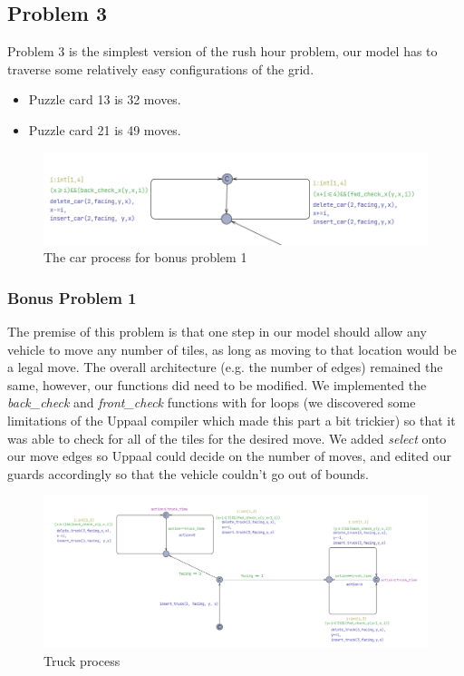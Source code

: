 \documentclass{article}
\begin{document}
\subsection{Problem 3}
Problem 3 is the simplest version of the rush hour problem, our model has to traverse some relatively easy configurations of the grid.
\begin{itemize}
    \item Puzzle card 13 is 32 moves.
    \item Puzzle card 21 is 49 moves.
\end{itemize}

\begin{figure}[hbt!]
    \centering
    \includegraphics[width=1\linewidth]{images/bonus1template.png}
    \caption{The car process for bonus problem 1}
\end{figure}
\newpage
\subsubsection{Bonus Problem 1}
The premise of this problem is that one step in our model should allow any vehicle to move any number of tiles, as long as moving to that location would be a legal move. \newline
 The overall architecture (e.g. the number of edges) remained the same, however, our functions did need to be modified. We implemented the \emph{back\_check} and \emph{front\_check} functions with for loops (we discovered some limitations of the Uppaal compiler which made this part a bit trickier) so that it was able to check for all of the tiles for the desired move. We added \emph{select} onto our move edges so Uppaal could decide on the number of moves, and edited our guards accordingly so that the vehicle couldn't go out of bounds.
 \begin{figure}
     \centering
     \includegraphics[width=1\linewidth]{images/truck_multimove.png}
     \caption{Truck process}
     \label{fig:enter-label}
 \end{figure}
\end{document}
